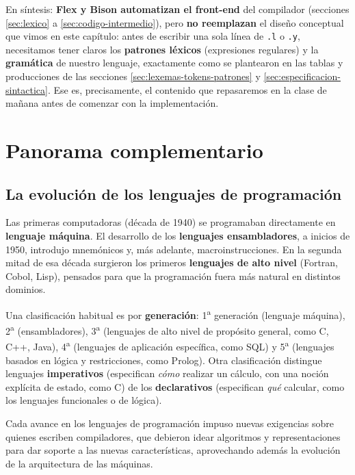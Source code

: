 \documentclass[11pt,a4paper]{article}
\begin{document}
En síntesis: \textbf{Flex y Bison automatizan el front-end} del compilador (secciones
\ref{sec:lexico} a \ref{sec:codigo-intermedio}), pero \textbf{no reemplazan} el diseño
conceptual que vimos en este capítulo: antes de escribir una sola línea de \texttt{.l} o
\texttt{.y}, necesitamos tener claros los \textbf{patrones léxicos} (expresiones regulares) y la
\textbf{gramática} de nuestro lenguaje, exactamente como se plantearon en las tablas y
producciones de las secciones \ref{sec:lexemas-tokens-patrones} y
\ref{sec:especificacion-sintactica}. Ese es, precisamente, el contenido que repasaremos en la
clase de mañana antes de comenzar con la implementación.

\section{Panorama complementario}

\subsection{La evolución de los lenguajes de programación}

Las primeras computadoras (década de 1940) se programaban directamente en \textbf{lenguaje
máquina}. El desarrollo de los \textbf{lenguajes ensambladores}, a inicios de 1950, introdujo
mnemónicos y, más adelante, macroinstrucciones. En la segunda mitad de esa década surgieron los
primeros \textbf{lenguajes de alto nivel} (Fortran, Cobol, Lisp), pensados para que la
programación fuera más natural en distintos dominios.

Una clasificación habitual es por \textbf{generación}: 1\textsuperscript{a} generación
(lenguaje máquina), 2\textsuperscript{a} (ensambladores), 3\textsuperscript{a} (lenguajes de
alto nivel de propósito general, como C, C++, Java), 4\textsuperscript{a} (lenguajes de
aplicación específica, como SQL) y 5\textsuperscript{a} (lenguajes basados en lógica y
restricciones, como Prolog). Otra clasificación distingue lenguajes \textbf{imperativos}
(especifican \textit{cómo} realizar un cálculo, con una noción explícita de estado, como C) de
los \textbf{declarativos} (especifican \textit{qué} calcular, como los lenguajes funcionales o
de lógica).

Cada avance en los lenguajes de programación impuso nuevas exigencias sobre quienes escriben
compiladores, que debieron idear algoritmos y representaciones para dar soporte a las nuevas
características, aprovechando además la evolución de la arquitectura de las máquinas.
\end{document}
